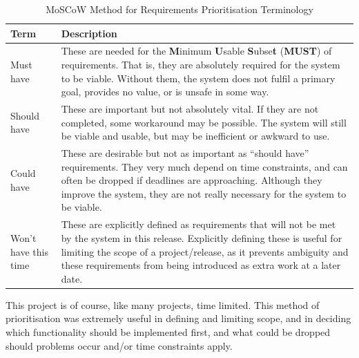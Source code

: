 \documentclass[11pt,openright,a4paper]{report}
\begin{document}
\begin{table}[ht]
\centering
\caption{MoSCoW Method for Requirements Prioritisation Terminology}
\label{table:moscow}
\begin{tabular}{|p{4cm}|p{10cm}|}
\hline
\textbf{Term} & \textbf{Description} \\ \hline
Must have & These are needed for the \textbf{M}inimum \textbf{U}sable \textbf{S}ubse\textbf{t} (\textbf{MUST}) of requirements. That is, they are absolutely required for the system to be viable. Without them, the system does not fulfil a primary goal, provides no value, or is unsafe in some way. \\  \hline
Should have & These are important but not absolutely vital. If they are not completed, some workaround may be possible. The system will still be viable and usable, but may be inefficient or awkward to use. \\ \hline
Could have & These are desirable but not as important as \enquote{should have} requirements. They very much depend on time constraints, and can often be dropped if deadlines are approaching. Although they improve the system, they are not really necessary for the system to be viable. \\ \hline
Won't have this time & These are explicitly defined as requirements that will not be met by the system in this release. Explicitly defining these is useful for limiting the scope of a project/release, as it prevents ambiguity and these requirements from being introduced as extra work at a later date. \\ \hline
\end{tabular}
\end{table}

This project is of course, like many projects, time limited. This method of prioritisation was extremely useful in defining and limiting scope, and in deciding which functionality should be implemented first, and what could be dropped should problems occur and/or time constraints apply.
\end{document}

